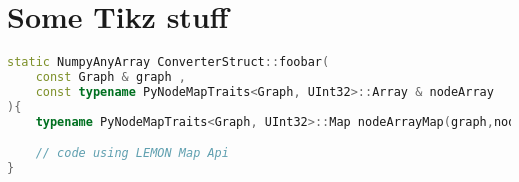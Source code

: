 \section{Some Tikz stuff}




\begin{lstlisting}[language=c++]
static NumpyAnyArray ConverterStruct::foobar(
    const Graph & graph , 
    const typename PyNodeMapTraits<Graph, UInt32>::Array & nodeArray
){
    typename PyNodeMapTraits<Graph, UInt32>::Map nodeArrayMap(graph,nodeArray)

    // code using LEMON Map Api 
}
\end{lstlisting}
